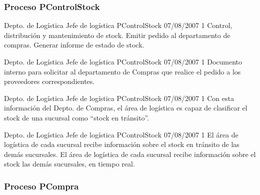 \subsubsection{Proceso \textsf{PControlStock}}

\begin{apx1}
{Depto. de Logística}
{Jefe de logística}
{PControlStock}
{07/08/2007}
{1}
{Control, distribución y mantenimiento de stock.}
    {Emitir pedido al departamento de compras.}
    {Generar informe de estado de stock.}
\end{apx1}

\begin{apx2}
{Depto. de Logística}
{Jefe de logística}
{PControlStock}
{07/08/2007}
{1}
    {Documento interno para solicitar al departamento de Compras que realice el pedido a los proveedores correspondientes.}
\end{apx2}

\begin{apx3}
{Depto. de Logística}
{Jefe de logística}
{PControlStock}
{07/08/2007}
{1}
    {Con esta información del Depto. de Compras, el área de logística
     es capaz de clasificar el stock de una sucursal como ``stock en
     tránsito''.}
\end{apx3}

\begin{apx4}
{Depto. de Logística}
{Jefe de logística}
{PControlStock}
{07/08/2007}
{1}
    {El área de logística de cada sucursal recibe información sobre el stock
     en tránsito de las demás sucursales.}
    {El área de logística de cada sucursal recibe información sobre el stock
     las demás sucursales, en tiempo real.}
\end{apx4}


\subsubsection{Proceso \textsf{PCompra}}


